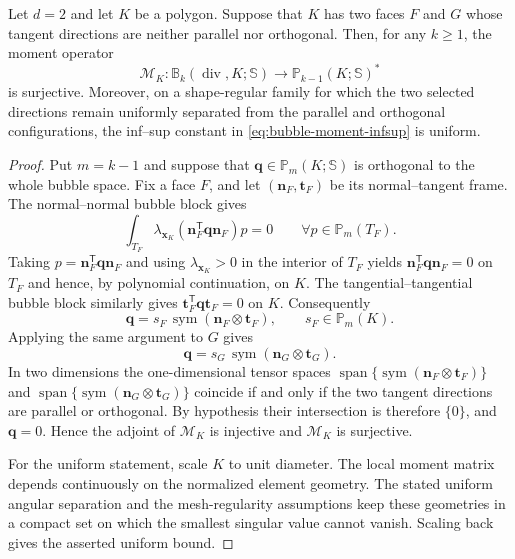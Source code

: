 \documentclass[review,hidelinks,onefignum,onetabnum]{siamart251216}
\renewcommand{\div}{\operatorname{div}}
\newcommand{\sym}{\operatorname{sym}}
\begin{document}
\begin{lemma}\label{lem:two-directions}
Let $d=2$ and let $K$ be a polygon.  Suppose that $K$ has two faces $F$ and
$G$ whose tangent directions are neither parallel nor orthogonal.  Then, for
any $k\ge1$, the moment operator
\[
 \mathcal M_K:\mathbb B_k(\div,K;\mathbb S)
 \longrightarrow \mathbb P_{k-1}(K;\mathbb S)^*
\]
is surjective.  Moreover, on a shape-regular family for which the two
selected directions remain uniformly separated from the parallel and
orthogonal configurations, the inf--sup constant in
\eqref{eq:bubble-moment-infsup} is uniform.
\end{lemma}
\begin{proof}
Put $m=k-1$ and suppose that
$\boldsymbol q\in\mathbb P_m(K;\mathbb S)$ is orthogonal to the whole bubble
space.  Fix a face $F$, and let $(\boldsymbol n_F,\boldsymbol t_F)$ be its
normal--tangent frame.  The normal--normal bubble block gives
\[
 \int_{T_F}\lambda_{\boldsymbol x_K}
 (\boldsymbol n_F^{\mathsf T}\boldsymbol q\boldsymbol n_F)p=0
 \qquad\forall p\in\mathbb P_m(T_F).
\]
Taking
$p=\boldsymbol n_F^{\mathsf T}\boldsymbol q\boldsymbol n_F$ and using
$\lambda_{\boldsymbol x_K}>0$ in the interior of $T_F$ yields
$\boldsymbol n_F^{\mathsf T}\boldsymbol q\boldsymbol n_F=0$ on $T_F$ and
hence, by polynomial continuation, on $K$.  The tangential--tangential
bubble block similarly gives
$\boldsymbol t_F^{\mathsf T}\boldsymbol q\boldsymbol t_F=0$ on $K$.
Consequently
\[
 \boldsymbol q=s_F\,\sym(\boldsymbol n_F\otimes\boldsymbol t_F),
 \qquad s_F\in\mathbb P_m(K).
\]
Applying the same argument to $G$ gives
\[
 \boldsymbol q=s_G\,\sym(\boldsymbol n_G\otimes\boldsymbol t_G).
\]
In two dimensions the one-dimensional tensor spaces
$\operatorname{span}\{\sym(\boldsymbol n_F\otimes\boldsymbol t_F)\}$ and
$\operatorname{span}\{\sym(\boldsymbol n_G\otimes\boldsymbol t_G)\}$
coincide if and only if the two tangent directions are parallel or
orthogonal.  By hypothesis their intersection is therefore $\{0\}$, and
$\boldsymbol q=0$.  Hence the adjoint of $\mathcal M_K$ is injective and
$\mathcal M_K$ is surjective.

For the uniform statement, scale $K$ to unit diameter.  The local moment
matrix depends continuously on the normalized element geometry.  The stated
uniform angular separation and the mesh-regularity assumptions keep these
geometries in a compact set on which the smallest singular value cannot
vanish.  Scaling back gives the asserted uniform bound.
\end{proof}
\end{document}
